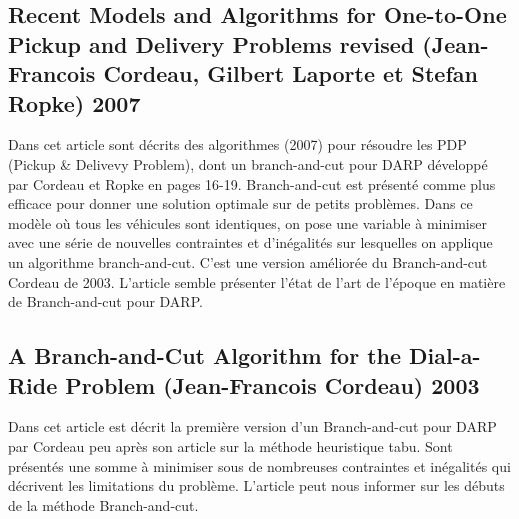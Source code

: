 \documentclass[10pt,a4paper]{report}
\begin{document}
\subsection*{Recent Models and Algorithms for One-to-One Pickup and Delivery Problems revised (Jean-Francois Cordeau, Gilbert Laporte et Stefan Ropke) 2007}
Dans cet article sont décrits des algorithmes (2007) pour résoudre les PDP (Pickup \& Delivevy Problem), dont un branch-and-cut pour DARP développé par Cordeau et Ropke en pages 16-19. Branch-and-cut est présenté comme plus efficace pour donner une solution optimale sur de petits problèmes. 
Dans ce modèle où tous les véhicules sont identiques, on pose une variable à minimiser avec une série de nouvelles contraintes et d'inégalités sur lesquelles on applique un algorithme branch-and-cut. C'est une version améliorée du Branch-and-cut Cordeau de 2003. 
L'article semble présenter l'état de l'art de l'époque en matière de Branch-and-cut pour DARP.
\subsection*{A Branch-and-Cut Algorithm for the Dial-a-Ride Problem (Jean-Francois Cordeau) 2003}
Dans cet article est décrit la première version d'un Branch-and-cut pour DARP par Cordeau peu après son article sur la méthode heuristique tabu. Sont présentés une somme à minimiser sous de nombreuses contraintes et inégalités qui décrivent les limitations du problème. L'article peut nous informer sur les débuts de la méthode Branch-and-cut.
\end{document}
